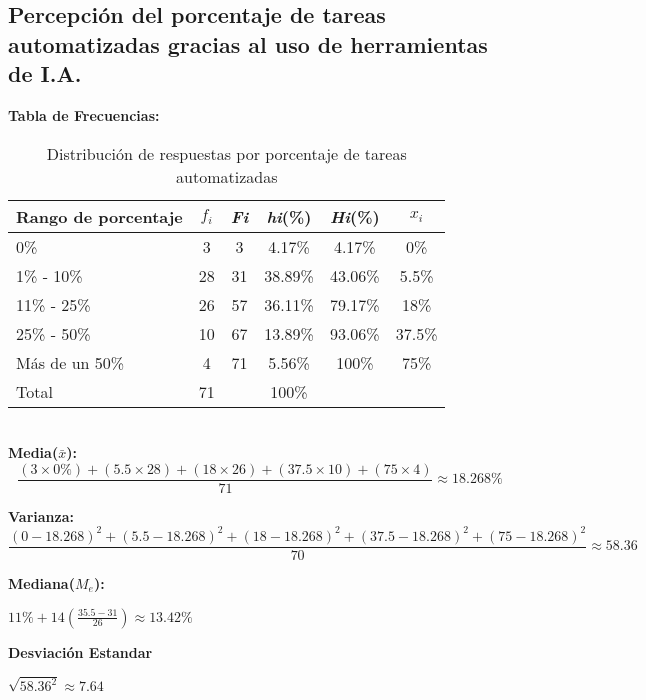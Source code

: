\subsection{Percepción del porcentaje de tareas automatizadas gracias al uso de herramientas de I.A.}
\noindent\textbf{Tabla de Frecuencias:}
\begin{table}[h!]
	\centering
	\renewcommand{\arraystretch}{1.5}
	\begin{tabular}{l c c c c c}
		\hline
		{Rango de porcentaje} & {\(f_i\)} & \textit{Fi} & \textit{hi}(\%) & \textit{Hi}(\%) & \(x_i\)\\
		\hline
		0\%                  & 3  & 3  & 4.17\%  & 4.17\% & 0\% \\
		1\% - 10\%           & 28 & 31 & 38.89\% & 43.06\% & 5.5\% \\
		11\% - 25\%          & 26 & 57 & 36.11\% & 79.17\% & 18\% \\
		25\% - 50\%          & 10 & 67 & 13.89\% & 93.06\% &37.5\% \\
		Más de un 50\%       & 4  & 71 & 5.56\%  & 100\% & 75\% \\
		\hline
		Total                & 71 &    & 100\%   & & \\
		\hline
	\end{tabular}
	\caption{Distribución de respuestas por porcentaje de tareas automatizadas}
	\label{tabla:porcentaje_IA}
\end{table} \\

\noindent\textbf{Media($\bar{x}$):}
\begin{equation*}
	\frac{(3 \times 0\%) + (5.5 \times 28) + (18 \times 26) + (37.5 \times 10) + (75 \times 4)}{71} \approx 18.268\%
\end{equation*}

\noindent\textbf{Varianza:}
\begin{equation*}
	\frac{(0-18.268)^2 + (5.5-18.268)^2 + (18-18.268)^2 + (37.5 - 18.268)^2 + (75 - 18.268)^2}{70} \approx 58.36
\end{equation*}

\begin{multicols}{2}
	\noindent\textbf{Mediana(\(M_e\)):}
	\begin{center}
		$11\% + 14(\frac{35.5 - 31}{26}) \approx 13.42\%$
	\end{center}
	\columnbreak
	\vfill
	\noindent\textbf{Desviación Estandar}
	\begin{center}
		$\sqrt{58.36^2} \approx 7.64$
	\end{center}
\end{multicols}

